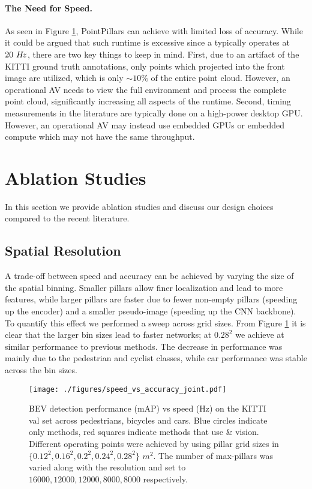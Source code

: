 \documentclass[10pt,twocolumn,letterpaper]{article}
\newcommand{\mypar}[1]{\vspace{-4mm}\paragraph{#1}}
\newcommand{\figref}[1]{Figure \ref{#1}}
\newcommand{\squeeze}{\vspace{-0.5mm}}
\begin{document}
\mypar{The Need for Speed.}
As seen in \figref{fig:speed_accuracy_val}, PointPillars can achieve \maxhertz with limited loss of accuracy.
While it could be argued that such runtime is excessive since a \lidar typically operates at $20~H\hspace{-.5mm}z$, there are two key things to keep in mind.
First, due to an artifact of the KITTI ground truth annotations, only \lidar points which projected into the front image are utilized, which is only $\sim 10\%$ of the entire point cloud. However, an operational AV needs to view the full environment and process the complete point cloud, significantly increasing all aspects of the runtime.
Second, timing measurements in the literature are typically done on a high-power desktop GPU. However, an operational AV may instead use embedded GPUs or embedded compute which may not have the same throughput.
 


\section{Ablation Studies} \label{sec:exp}
\squeeze
In this section we provide ablation studies and discuss our design choices compared to the recent literature.

\squeeze
\subsection{Spatial Resolution}
\squeeze
A trade-off between speed and accuracy can be achieved by varying the size of the spatial binning.
Smaller pillars allow finer localization and lead to more features, while larger pillars are faster due to fewer non-empty pillars (speeding up the encoder) and a smaller pseudo-image (speeding up the CNN backbone).
To quantify this effect we performed a sweep across grid sizes.
From \figref{fig:speed_accuracy_val} it is clear that the larger bin sizes lead to faster networks; at $0.28^2$ we achieve \maxhertz at similar performance to previous methods.
The decrease in performance was mainly due to the pedestrian and cyclist classes, while car performance was stable across the bin sizes.

\begin{figure}
\begin{center}
\texttt{[image: ./figures/speed\_vs\_accuracy\_joint.pdf]}
\end{center}
\vspace{-3mm}
\caption{BEV detection performance (mAP) vs speed (Hz) on the KITTI~\cite{kitti} val set across pedestrians, bicycles and cars.
Blue circles indicate \lidar only methods, red squares indicate methods that use \lidar \& vision.
Different operating points were achieved by using pillar grid sizes in $\{0.12^2, 0.16^2, 0.2^2, 0.24^2, 0.28^2\}$ $m^2$. The number of max-pillars was varied along with the resolution and set to $16000, 12000, 12000, 8000, 8000$ respectively.
}
\label{fig:speed_accuracy_val}
\end{figure}
\end{document}
